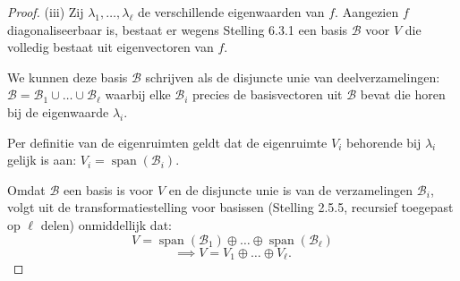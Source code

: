\begin{proof}(iii)
    Zij $\lambda_1, \dots, \lambda_\ell$ de verschillende eigenwaarden van $f$.
    Aangezien $f$ diagonaliseerbaar is, bestaat er wegens Stelling 6.3.1 een basis $\mathcal{B}$ voor $V$ die volledig bestaat uit eigenvectoren van $f$.

    We kunnen deze basis $\mathcal{B}$ schrijven als de disjuncte unie van deelverzamelingen:
    \(\mathcal{B} = \mathcal{B}_1 \cup \dots \cup \mathcal{B}_\ell \)
    waarbij elke $\mathcal{B}_i$ precies de basisvectoren uit $\mathcal{B}$ bevat die horen bij de eigenwaarde $\lambda_i$.

    Per definitie van de eigenruimten geldt dat de eigenruimte $V_i$ behorende bij $\lambda_i$ gelijk is aan:
    \(V_i = \operatorname{span}(\mathcal{B}_i). \)

    Omdat $\mathcal{B}$ een basis is voor $V$ en de disjuncte unie is van de verzamelingen $\mathcal{B}_i$, volgt uit de transformatiestelling voor basissen (Stelling 2.5.5, recursief toegepast op $\ell$ delen) onmiddellijk dat:
    \[ V = \operatorname{span}(\mathcal{B}_1) \oplus \dots \oplus \operatorname{span}(\mathcal{B}_\ell) \]
    \[ \implies V = V_1 \oplus \dots \oplus V_\ell. \]
\end{proof}

